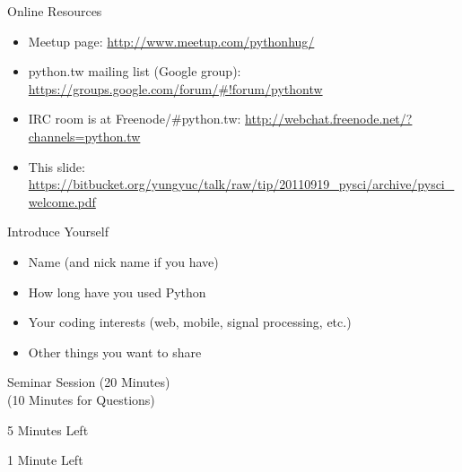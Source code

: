 \documentclass[dvips,xcolor=pst]{beamer}
\begin{document}
\begin{frame}{
%
Online Resources
%
}
\begin{itemize} \large
  \item Meetup page: \url{http://www.meetup.com/pythonhug/}
  \item python.tw mailing list (Google group):
  \url{https://groups.google.com/forum/\#!forum/pythontw}
  \item IRC room is at Freenode/\#python.tw:
  \url{http://webchat.freenode.net/?channels=python.tw}
  \item This slide: {\tiny
  \url{https://bitbucket.org/yungyuc/talk/raw/tip/20110919_pysci/archive/pysci_welcome.pdf}}
\end{itemize}
\end{frame}

\begin{frame}{
%
Introduce Yourself
%
}
\begin{itemize} \large
  \item Name (and nick name if you have)
  \item How long have you used Python
  \item Your coding interests (web, mobile, signal processing, etc.)
  \item Other things you want to share
\end{itemize}
\end{frame}

\begin{frame}{
%
%
}
\begin{center} \Huge
  Seminar Session (20 Minutes) \\
  (10 Minutes for Questions)
\end{center}
\end{frame}

\begin{frame}{
%
%
}
\begin{center} \Huge
  5 Minutes Left
\end{center}
\end{frame}

\begin{frame}{
%
%
}
\begin{center} \Huge
  \alert{1 Minute Left}
\end{center}
\end{frame}
\end{document}
